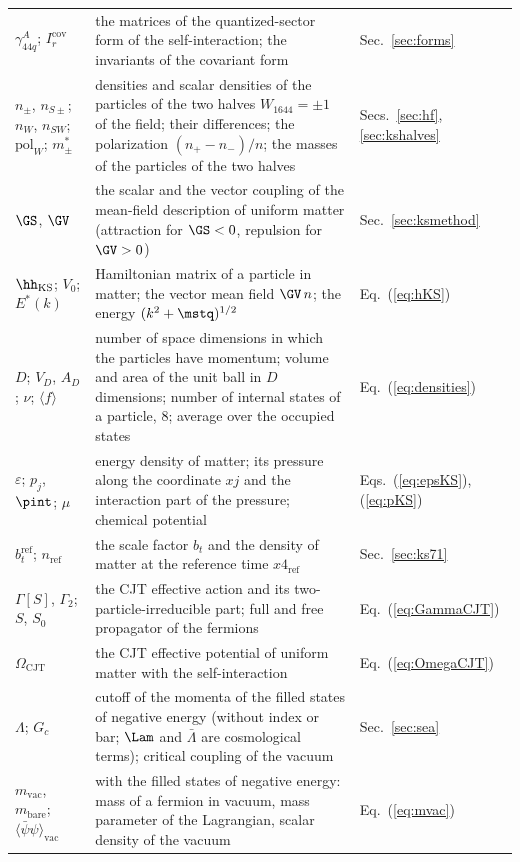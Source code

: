 \begin{table}
\begin{ruledtabular}
\begin{tabular}{p{}p{}p{}}
$\gamma_{44q}^{A}$; $I_r^{\mathrm{cov}}$ & the matrices of the quantized-sector form of the self-interaction; the invariants of the covariant form & Sec.~\ref{sec:forms} \\
$n_\pm$, $n_{S\pm}$; $n_W$, $n_{SW}$; $\mathrm{pol}_W$; $m^{*}_{\pm}$ & densities and scalar densities of the particles of the two halves $W_{1644}=\pm1$ of the field; their differences; the polarization $(n_+-n_-)/n$; the masses of the particles of the two halves & Secs.~\ref{sec:hf}, \ref{sec:kshalves} \\
$\GS$, $\GV$ & the scalar and the vector coupling of the mean-field description of uniform matter (attraction for $\GS<0$, repulsion for $\GV>0$) & Sec.~\ref{sec:ksmethod} \\
$\hh_{\mathrm{KS}}$; $V_0$; $E^{*}(k)$ & Hamiltonian matrix of a particle in matter; the vector mean field $\GV\,n$; the energy $(k^{2}+\mstq)^{1/2}$ & Eq.~(\ref{eq:hKS}) \\
$D$; $V_D$, $A_D$; $\nu$; $\langle f\rangle$ & number of space dimensions in which the particles have momentum; volume and area of the unit ball in $D$ dimensions; number of internal states of a particle, 8; average over the occupied states & Eq.~(\ref{eq:densities}) \\
$\varepsilon$; $p_j$, $\pint$; $\mu$ & energy density of matter; its pressure along the coordinate $xj$ and the interaction part of the pressure; chemical potential & Eqs.~(\ref{eq:epsKS}), (\ref{eq:pKS}) \\
$b_t^{\mathrm{ref}}$; $n_{\mathrm{ref}}$ & the scale factor $b_t$ and the density of matter at the reference time $x4_{\mathrm{ref}}$ & Sec.~\ref{sec:ks71} \\
$\Gamma[S]$, $\Gamma_2$; $S$, $S_0$ & the CJT effective action and its two-particle-irreducible part; full and free propagator of the fermions & Eq.~(\ref{eq:GammaCJT}) \\
$\Omega_{\mathrm{CJT}}$ & the CJT effective potential of uniform matter with the self-interaction & Eq.~(\ref{eq:OmegaCJT}) \\
$\Lambda$; $G_c$ & cutoff of the momenta of the filled states of negative energy (without index or bar; $\Lam$ and $\bar\Lambda$ are cosmological terms); critical coupling of the vacuum & Sec.~\ref{sec:sea} \\
$m_{\mathrm{vac}}$, $m_{\mathrm{bare}}$; $\langle\bar\psi\psi\rangle_{\mathrm{vac}}$ & with the filled states of negative energy: mass of a fermion in vacuum, mass parameter of the Lagrangian, scalar density of the vacuum & Eq.~(\ref{eq:mvac}) \\

\end{tabular}
\end{ruledtabular}
\end{table}
